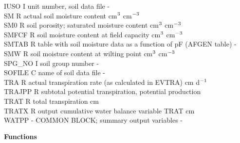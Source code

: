 \begin{tabbing}
IUSO\> \> I\> unit number, soil data file\> \> \> \> \> \> \> -\\
SM\> \> R\> actual soil moisture content\> \> \> \> \> \> \> cm$^{{\rm 3}}$ cm$^{{\rm -3}}$\\
SM0\> \> R\> soil porosity; saturated moisture content\> \> \> \> \> \> \> cm$^{{\rm 3}}$ cm$^{{\rm -3}}$\\
SMFCF\> \> R\> soil moisture content at field capacity\> \> \> \> \> \> \> cm$^{{\rm 3}}$ cm$^{{\rm -3}}$\\
SMTAB\> \> R\> table with soil moisture data as a function of pF (AFGEN table)\> \> \> \> \> \> \> -\\
SMW\> \> R\> soil moisture content at wilting point\> \> \> \> \> \> \> cm$^{{\rm 3}}$ cm$^{{\rm -3}}$\\
SPG\_NO\> \> I\> soil group number\> \> \> \> \> \> \> -\\
SOFILE\> \> C\> name of soil data file\> \> \> \> \> \> \> -\\
TRA\> \> R\> actual transpiration rate (as calculated in EVTRA)\> \> \> \> \> \> \> cm d$^{{\rm -1}}$\\
TRAJPP\> \> R\> subtotal potential transpiration, potential production\\
TRAT\> \> R\> total transpiration\> \> \> \> \> \> \> cm\\
TRATX\> \> R\> output cumulative water balance variable TRAT\> \> \> \> \> \> \> cm\\
WATPP\> \> -\> COMMON BLOCK; summary output variables\> \> \> \> \> \> \> -
\end{tabbing}
\newpage
{\large {\bf Functions}}

